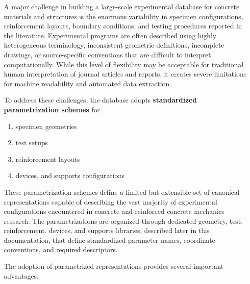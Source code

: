 \documentclass[11pt]{book}
\begin{document}
A major challenge in building a large-scale experimental database for concrete materials and structures is the enormous variability in specimen configurations, reinforcement layouts, boundary conditions, and testing procedures reported in the literature. Experimental programs are often described using highly heterogeneous terminology, inconsistent geometric definitions, incomplete drawings, or source-specific conventions that are difficult to interpret computationally. While this level of flexibility may be acceptable for traditional human interpretation of journal articles and reports, it creates severe limitations for machine readability and automated data extraction.

To address these challenges, the database adopts \textbf{standardized parametrization schemes} for 
\begin{enumerate}
    \item specimen geometries
    \item test setups
    \item reinforcement layouts
    \item devices, and supports configurations
\end{enumerate}

These parametrization schemes define a limited but extensible set of canonical representations capable of describing the vast majority of experimental configurations encountered in concrete and reinforced concrete mechanics research. The parametrizations are organized through dedicated geometry, test, reinforcement, devices, and supports libraries, described later in this documentation, that define standardized parameter names, coordinate conventions, and required descriptors.

\vspace{5mm}
The adoption of parametrized representations provides several important advantages.
\end{document}
